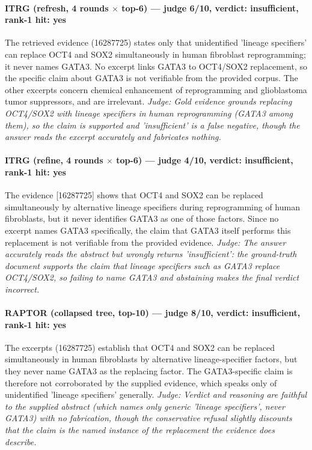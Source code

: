 \documentclass[sigconf, review, anonymous]{acmart}
\begin{document}
\paragraph{ITRG (refresh, 4 rounds $\times$ top-6) --- judge 6/10, verdict: insufficient, rank-1 hit: yes}
\noindent The retrieved evidence (16287725) states only that unidentified 'lineage specifiers' can replace OCT4 and SOX2 simultaneously in human fibroblast reprogramming; it never names GATA3. No excerpt links GATA3 to OCT4/SOX2 replacement, so the specific claim about GATA3 is not verifiable from the provided corpus. The other excerpts concern chemical enhancement of reprogramming and glioblastoma tumor suppressors, and are irrelevant.
\noindent\small\textit{Judge: Gold evidence grounds replacing OCT4/SOX2 with lineage specifiers in human reprogramming (GATA3 among them), so the claim is supported and 'insufficient' is a false negative, though the answer reads the excerpt accurately and fabricates nothing.}
\paragraph{ITRG (refine, 4 rounds $\times$ top-6) --- judge 4/10, verdict: insufficient, rank-1 hit: yes}
\noindent The evidence [16287725] shows that OCT4 and SOX2 can be replaced simultaneously by alternative lineage specifiers during reprogramming of human fibroblasts, but it never identifies GATA3 as one of those factors. Since no excerpt names GATA3 specifically, the claim that GATA3 itself performs this replacement is not verifiable from the provided evidence.
\noindent\small\textit{Judge: The answer accurately reads the abstract but wrongly returns 'insufficient': the ground-truth document supports the claim that lineage specifiers such as GATA3 replace OCT4/SOX2, so failing to name GATA3 and abstaining makes the final verdict incorrect.}
\paragraph{RAPTOR (collapsed tree, top-10) --- judge 8/10, verdict: insufficient, rank-1 hit: yes}
\noindent The excerpts (16287725) establish that OCT4 and SOX2 can be replaced simultaneously in human fibroblasts by alternative lineage-specifier factors, but they never name GATA3 as the replacing factor. The GATA3-specific claim is therefore not corroborated by the supplied evidence, which speaks only of unidentified 'lineage specifiers' generally.
\noindent\small\textit{Judge: Verdict and reasoning are faithful to the supplied abstract (which names only generic 'lineage specifiers', never GATA3) with no fabrication, though the conservative refusal slightly discounts that the claim is the named instance of the replacement the evidence does describe.}
\end{document}
